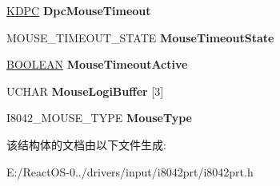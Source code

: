 \begin{DoxyCompactItemize}
\mbox{\label{struct___i8042___m_o_u_s_e___e_x_t_e_n_s_i_o_n_ab911c865e5d0dd13c2e0e4cd51067395}} 
\hyperlink{struct___k_d_p_c}{K\+D\+PC} {\bfseries Dpc\+Mouse\+Timeout}
\item 
\mbox{\label{struct___i8042___m_o_u_s_e___e_x_t_e_n_s_i_o_n_a5a3d1000182b0962eac8839cc54e4da2}} 
M\+O\+U\+S\+E\+\_\+\+T\+I\+M\+E\+O\+U\+T\+\_\+\+S\+T\+A\+TE {\bfseries Mouse\+Timeout\+State}
\item 
\mbox{\label{struct___i8042___m_o_u_s_e___e_x_t_e_n_s_i_o_n_ab6d03569a01fc176b98fd2bc5abac4f1}} 
\hyperlink{_processor_bind_8h_a112e3146cb38b6ee95e64d85842e380a}{B\+O\+O\+L\+E\+AN} {\bfseries Mouse\+Timeout\+Active}
\item 
\mbox{\label{struct___i8042___m_o_u_s_e___e_x_t_e_n_s_i_o_n_a2d962be25e74e07d8c8ff62b4758df25}} 
U\+C\+H\+AR {\bfseries Mouse\+Logi\+Buffer} \mbox{[}3\mbox{]}
\item 
\mbox{\label{struct___i8042___m_o_u_s_e___e_x_t_e_n_s_i_o_n_a4be89335ea9df787bf17098aa6126482}} 
I8042\+\_\+\+M\+O\+U\+S\+E\+\_\+\+T\+Y\+PE {\bfseries Mouse\+Type}
\end{DoxyCompactItemize}


该结构体的文档由以下文件生成\+:\begin{DoxyCompactItemize}
\item 
E\+:/\+React\+O\+S-\/0../drivers/input/i8042prt/i8042prt.\+h\end{DoxyCompactItemize}
